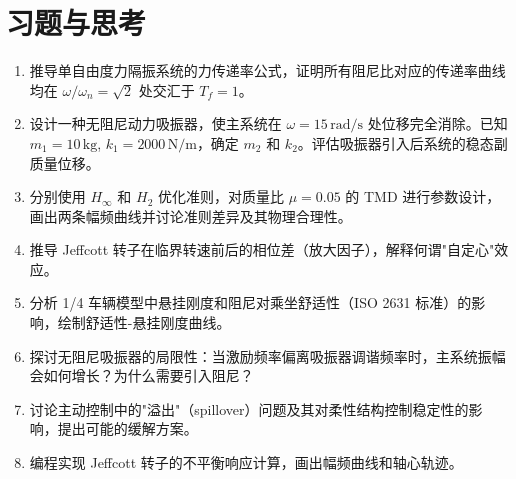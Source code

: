 \section{习题与思考}
\begin{enumerate}
    \item 推导单自由度力隔振系统的力传递率公式，证明所有阻尼比对应的传递率曲线均在 $\omega/\omega_n = \sqrt{2}$ 处交汇于 $T_f = 1$。
    \item 设计一种无阻尼动力吸振器，使主系统在 $\omega = 15\,\text{rad/s}$ 处位移完全消除。已知 $m_1 = 10\,\text{kg}$, $k_1 = 2000\,\text{N/m}$，确定 $m_2$ 和 $k_2$。评估吸振器引入后系统的稳态副质量位移。
    \item 分别使用 $H_\infty$ 和 $H_2$ 优化准则，对质量比 $\mu = 0.05$ 的 TMD 进行参数设计，画出两条幅频曲线并讨论准则差异及其物理合理性。
    \item 推导 Jeffcott 转子在临界转速前后的相位差（放大因子），解释何谓"自定心"效应。
    \item 分析 1/4 车辆模型中悬挂刚度和阻尼对乘坐舒适性（ISO 2631 标准）的影响，绘制舒适性-悬挂刚度曲线。
    \item 探讨无阻尼吸振器的局限性：当激励频率偏离吸振器调谐频率时，主系统振幅会如何增长？为什么需要引入阻尼？
    \item 讨论主动控制中的"溢出"（spillover）问题及其对柔性结构控制稳定性的影响，提出可能的缓解方案。
    \item 编程实现 Jeffcott 转子的不平衡响应计算，画出幅频曲线和轴心轨迹。
\end{enumerate}
